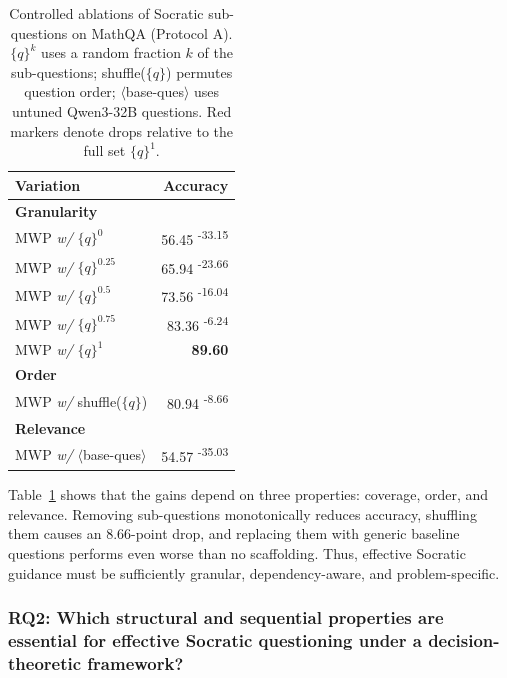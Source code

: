 \documentclass[sigconf, anonymous, review, screen]{acmart}
\newcommand{\decline}[1]{\textsuperscript{\colorbox{lightred}{\textcolor{textred}{\tiny -#1}}}}
\begin{document}
\begin{table}[t]
\centering
\footnotesize
\caption{Controlled ablations of Socratic sub-questions on MathQA (Protocol A). $\{q\}^k$ uses a random fraction $k$ of the sub-questions; shuffle($\{q\}$) permutes question order; $\langle$base-ques$\rangle$ uses untuned Qwen3-32B questions. Red markers denote drops relative to the full set $\{q\}^1$.}
\label{tab:socratic-ablation-study}

\begin{tabular}{lr}
\toprule
\textbf{Variation} & \textbf{Accuracy} \\
\midrule
\multicolumn{2}{l}{\textbf{Granularity}} \\
\quad MWP \textit{w/} $\{q\}^0$ & 56.45 \decline{33.15} \\
\quad MWP \textit{w/} $\{q\}^{0.25}$ & 65.94 \decline{23.66} \\
\quad MWP \textit{w/} $\{q\}^{0.5}$ & 73.56 \decline{16.04} \\
\quad MWP \textit{w/} $\{q\}^{0.75}$ & 83.36 \decline{6.24} \\
\quad MWP \textit{w/} $\{q\}^1$ & \textbf{89.60} \\
\midrule
\multicolumn{2}{l}{\textbf{Order}} \\
\quad MWP \textit{w/} shuffle($\{q\}$) & 80.94 \decline{8.66} \\
\midrule
\multicolumn{2}{l}{\textbf{Relevance}} \\
\quad MWP \textit{w/} $\langle$base-ques$\rangle$ & 54.57 \decline{35.03} \\
\bottomrule
\end{tabular}

\end{table}

Table~\ref{tab:socratic-ablation-study} shows that the gains depend on three properties: coverage, order, and relevance. Removing sub-questions monotonically reduces accuracy, shuffling them causes an 8.66-point drop, and replacing them with generic baseline questions performs even worse than no scaffolding. Thus, effective Socratic guidance must be sufficiently granular, dependency-aware, and problem-specific.

\subsubsection{\textbf{RQ2: Which structural and sequential properties are essential for effective Socratic questioning under a decision-theoretic framework?}}
\end{document}
